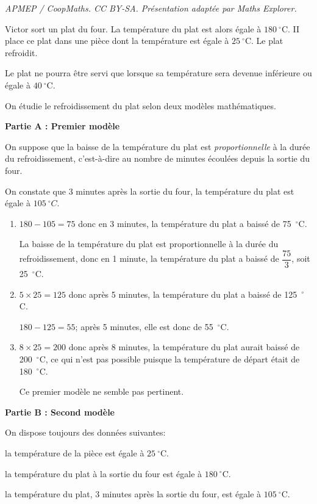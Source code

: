 \documentclass[10pt]{article}
\providecommand{\degres}{\ensuremath{^\circ}}
\providecommand{\degres}{{^\circ}}
\begin{document}
\noindent\textit{APMEP / CoopMaths. CC BY-SA. Présentation adaptée par Maths Explorer.}\par\medskip
\medskip

Victor sort un plat du four. La température du plat est alors égale à $180~\degres$C. II place ce plat dans une pièce dont la température est égale à $25~\degres$C. Le plat refroidit.

Le plat ne pourra être servi que lorsque sa température sera devenue inférieure ou égale à $40~\degres$C.

On étudie le refroidissement du plat selon deux modèles mathématiques.

\bigskip

\textbf{Partie A : Premier modèle}

\medskip

On suppose que la baisse de la température du plat est \textit{proportionnelle} à la durée du refroidissement, c'est-à-dire au nombre de minutes écoulées depuis la sortie du four.

On constate que 3 minutes après la sortie du four, la température du plat est égale à $105~\degres C$.

\begin{enumerate}
\item 
$180-105=75$ donc en 3 minutes, la température du plat a baissé de 75~$\degres$C.

La baisse de la température du plat est proportionnelle à la durée du refroidissement, donc en 1 minute, la température du plat a baissé de $\dfrac{75}{3}$, soit 25~$\degres$C.

\item 
$5\times 25=125$ donc après 5 minutes, la température du plat a baissé de 125~$\degres$C.

$180-125=55$; après 5 minutes, elle est donc de 55~$\degres$C.

\item 
$8\times 25=200$ donc après 8 minutes, la température du plat aurait baissé de 200~$\degres$C, ce qui n'est pas possible puisque la température de départ était de 180~$\degres$C.

Ce premier modèle ne semble pas pertinent.

\end{enumerate}


\textbf{Partie B : Second modèle}

\medskip

\begin{list}{\textbullet}{On dispose toujours des données suivantes:}
\item la température de la pièce est égale à $25~\degres$C.
\item la température du plat à la sortie du four est égale à $180~\degres$C.
\item la température du plat, 3 minutes après la sortie du four, est égale à $105~\degres$C.
\end{list}
\end{document}
